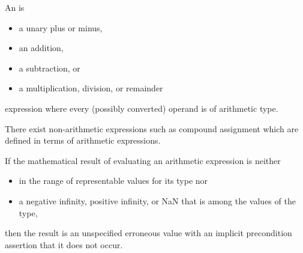 \pnum
{}%
%
%
%
%
An  is
\begin{itemize}
\item a unary plus or minus,
\item an addition,
\item a subtraction, or
\item a multiplication, division, or remainder
\end{itemize}
expression where every (possibly converted) operand is of arithmetic type.
\begin{note}
There exist non-arithmetic expressions such as compound assignment
which are defined in terms of arithmetic expressions.
\end{note}
If the mathematical result of evaluating an arithmetic expression is neither
\begin{itemize}
\item
in the range of representable values for its type nor
\item
a negative infinity, positive infinity, or NaN
that is among the values of the type,
\end{itemize}
then the result is an unspecified erroneous value
with an implicit precondition assertion
that it does not occur.
%
%
%
%
%
